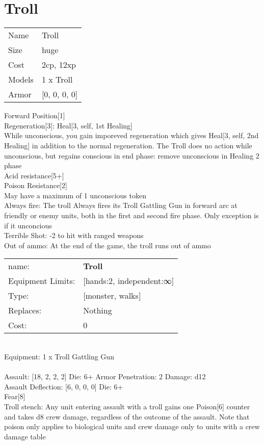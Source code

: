 \pagebreak

\section{ Troll }

\begin{tabular}{ll}
  Name & Troll \\
  Size & huge\\
  Cost & 2cp, 12xp\\
  Models & 1 x Troll\\
  Armor & [0, 0, 0, 0]\\
\end{tabular}

\noindent Forward Position[1]\\ 
Regeneration[3]: Heal[3, self, 1st Healing]\\ 
While unconscious, you gain imporeved regeneration which gives Heal[3, self, 2nd Healing] in addition to the normal regeneration. The Troll does no action while unconscious, but regains conscious in end phase: remove unconscious in Healing 2 phase\\ 
Acid resistance[5+]\\ 
Poison Resistance[2]\\ 
May have a maximum of 1 unconscious token\\ 
Always fire: The troll Always fires its Troll Gattling Gun in forward arc at friendly or enemy units, both in the first and second fire phase. Only exception is if it unconcious\\ 
Terrible Shot: -2 to hit with ranged weapons\\ 
Out of ammo: At the end of the game, the troll runs out of ammo\\ 


\noindent
\begin{tabular}{ll}
name: &{\bf Troll } \\
Equipment Limits: &[hands:2, independent:∞] \\
Type: &[monster, walks] \\
Replaces: &Nothing \\
Cost: & 0\\
\end{tabular}
\ \\
Equipment: 1 x Troll Gattling Gun \\
\ \\
Assault: [18, 2, 2, 2] Die: 6+ Armor Penetration: 2 Damage: d12 \\
Assault Deflection: [6, 0, 0, 0] Die: 6+\\
\indent Fear[8]\\ 
Troll stench: Any unit entering assault with a troll gains one Poison[6] counter and takes d8 crew damage, regardless of the outcome of the assault. Note that poison only applies to biological units and crew damage only to units with a crew damage table\\ 
 
